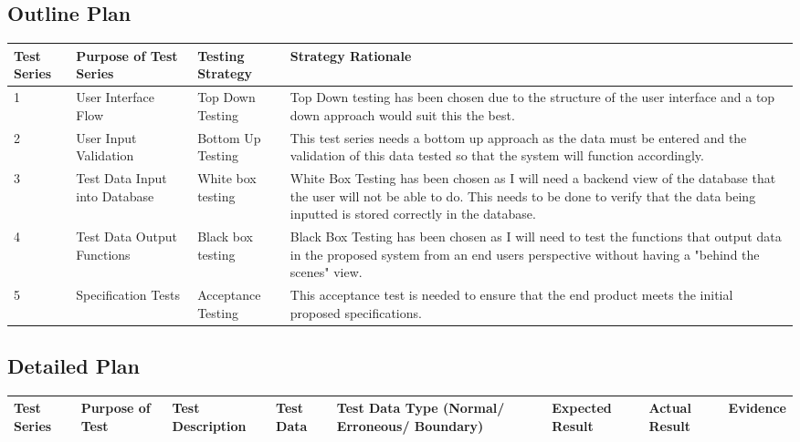 \begin{landscape}
\subsection{Outline Plan}

\begin{center}
\begin{tabular}{|p{2cm}|p{5cm}|p{5cm}|p{4cm}|}
\hline
\textbf{Test Series} & \textbf{Purpose of Test Series} & \textbf{Testing Strategy} & \textbf{Strategy Rationale}\\ \hline
1 & User Interface Flow & Top Down Testing & Top Down testing has been chosen due to the structure of the user interface and a top down approach would suit this the best. \\ \hline
2 & User Input Validation & Bottom Up Testing & This test series needs a bottom up approach as the data must be entered and the validation of this data tested so that the system will function accordingly. \\ \hline
3 & Test Data Input into Database & White box testing & White Box Testing has been chosen as I will need a backend view of the database that the user will not be able to do. This needs to be done to verify that the data being inputted is stored correctly in the database. \\ \hline
4 & Test Data Output Functions & Black box testing & Black Box Testing has been chosen as I will need to test the functions that output data in the proposed system from an end users perspective without having a "behind the scenes" view. \\ \hline
5 & Specification Tests & Acceptance Testing & This acceptance test is needed to ensure that the end product meets the initial proposed specifications. \\ \hline
\end{tabular}
\end{center}

\subsection{Detailed Plan}

\begin{center}
    \begin{longtable}{|p{1.5cm}|p{2.5cm}|p{2.5cm}|p{2cm}|p{2cm}|p{2cm}|p{2cm}|p{2cm}|}
        \hline
        \textbf{Test Series} & \textbf{Purpose of Test} & \textbf{Test Description} & \textbf{Test Data} & \textbf{Test Data Type (Normal/ Erroneous/ Boundary)} & \textbf{Expected Result} & \textbf{Actual Result} & \textbf{Evidence}\\ \hline



\end{longtable}
\end{center}
\end{landscape}
